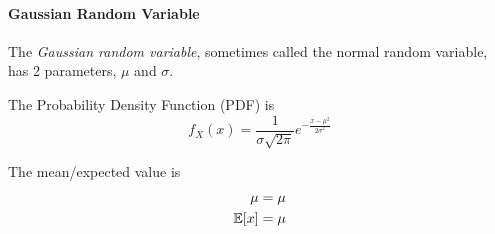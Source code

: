 \paragraph{Gaussian Random Variable}\label{par:Gaussian_Random_Variable}
\begin{definition}\label{def:Gaussian_Random_Variable}
  The \emph{Gaussian random variable}, sometimes called the normal random variable, has 2 parameters, $\mu$ and $\sigma$.

  The Probability Density Function (PDF) is
  \begin{equation}\label{eq:Gaussian_Random_Variable-PDF}
    f_{X}(x) = \frac{1}{\sigma \sqrt{2 \pi}} e^{- \frac{{x-\mu}^{2}}{2 \sigma^{2}}}
  \end{equation}

  The mean/expected value is
  \begin{equation}\label{eq:Gaussian_Random_Variable-Expected_Value}
    \begin{aligned}
      \mu &= \mu \\
      \operatorname{\operatorname{\mathbb{E}}}[x] &= \mu \\
    \end{aligned}
  \end{equation}

\end{definition}
